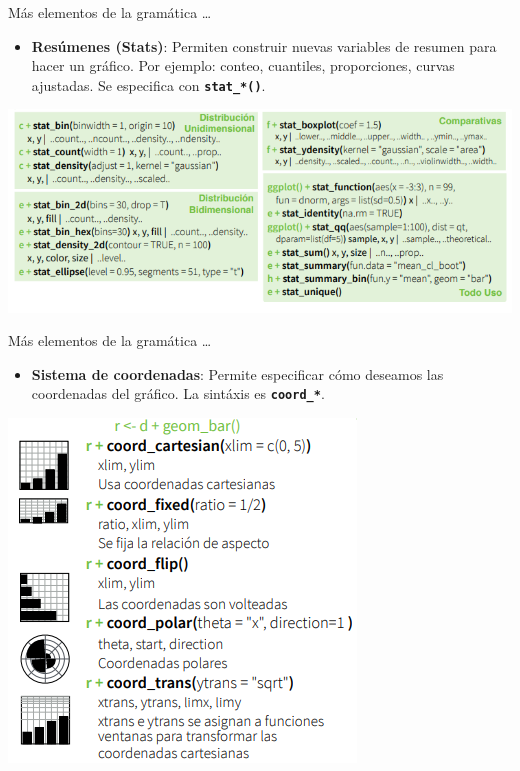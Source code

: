 \documentclass[
  ignorenonframetext,
  aspectratio=169]{beamer}
\providecommand{\tightlist}{%
  \setlength{\itemsep}{0pt}\setlength{\parskip}{0pt}}
\begin{document}
\begin{frame}[fragile]{Más elementos de la gramática \ldots{}}
\protect\hypertarget{muxe1s-elementos-de-la-gramuxe1tica-1}{}
\begin{itemize}
\tightlist
\item
  \textbf{Resúmenes (Stats)}: Permiten construir nuevas variables de
  resumen para hacer un gráfico. Por ejemplo: conteo, cuantiles,
  proporciones, curvas ajustadas. Se especifica con
  \textbf{\texttt{stat\_*()}}.
\end{itemize}

\begin{center}\includegraphics[width=0.7\linewidth,height=0.6\textheight]{Imgs/stats} \end{center}
\end{frame}

\begin{frame}[fragile]{Más elementos de la gramática \ldots{}}
\protect\hypertarget{muxe1s-elementos-de-la-gramuxe1tica-2}{}
\begin{itemize}
\tightlist
\item
  \textbf{Sistema de coordenadas}: Permite especificar cómo deseamos las
  coordenadas del gráfico. La sintáxis es \textbf{\texttt{coord\_*}}.
\end{itemize}

\begin{center}\includegraphics[width=0.4\linewidth,height=0.5\textheight]{Imgs/coordenadas} \end{center}
\end{frame}
\end{document}
